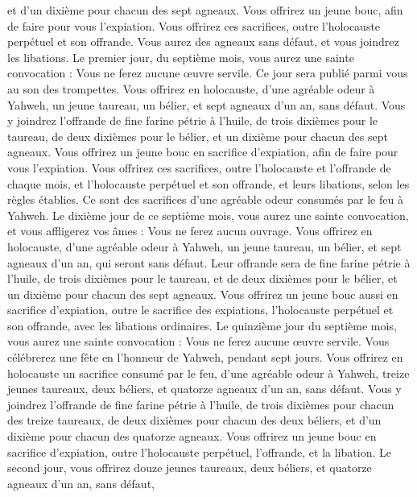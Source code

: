 \begin{multicols}{2}
et d'un dixième pour chacun des sept agneaux.
Vous offrirez un jeune bouc, afin de faire pour vous l’expiation.
Vous offrirez ces sacrifices, outre l'holocauste perpétuel et son offrande. Vous aurez des agneaux sans défaut, et vous joindrez les libations.
\VerseOne{}Le premier jour, du septième mois, vous aurez une sainte convocation : Vous ne ferez aucune œuvre servile. Ce jour sera publié parmi vous au son des trompettes.
Vous offrirez en holocauste, d’une agréable odeur à Yahweh, un jeune taureau, un bélier, et sept agneaux d'un an, sans défaut.
Vous y joindrez l’offrande de fine farine pétrie à l'huile, de trois dixièmes pour le taureau, de deux dixièmes pour le bélier,
et un dixième pour chacun des sept agneaux.
Vous offrirez un jeune bouc en sacrifice d’expiation, afin de faire pour vous l’expiation.
Vous offrirez ces sacrifices, outre l'holocauste et l’offrande de chaque mois, et l'holocauste perpétuel et son offrande, et leurs libations, selon les règles établies. Ce sont des sacrifices d’une agréable odeur consumés par le feu à Yahweh.
Le dixième jour de ce septième mois, vous aurez une sainte convocation, et vous affligerez vos âmes : Vous ne ferez aucun ouvrage.
Vous offrirez en holocauste, d’une agréable odeur à Yahweh, un jeune taureau, un bélier, et sept agneaux d'un an, qui seront sans défaut.
Leur offrande sera de fine farine pétrie à l'huile, de trois dixièmes pour le taureau, et de deux dixièmes pour le bélier,
et un dixième pour chacun des sept agneaux.
Vous offrirez un jeune bouc aussi en sacrifice d’expiation, outre le sacrifice des expiations, l'holocauste perpétuel et son offrande, avec les libations ordinaires.
Le quinzième jour du septième mois, vous aurez une sainte convocation : Vous ne ferez aucune œuvre servile. Vous célébrerez une fête en l’honneur de Yahweh, pendant sept jours.
Vous offrirez en holocauste un sacrifice consumé par le feu, d’une agréable odeur à Yahweh, treize jeunes taureaux, deux béliers, et quatorze agneaux d'un an, sans défaut.
Vous y joindrez l’offrande de fine farine pétrie à l'huile, de trois dixièmes pour chacun des treize taureaux, de deux dixièmes pour chacun des deux béliers,
et d'un dixième pour chacun des quatorze agneaux.
Vous offrirez un jeune bouc en sacrifice d’expiation, outre l'holocauste perpétuel, l’offrande, et la libation.
Le second jour, vous offrirez douze jeunes taureaux, deux béliers, et quatorze agneaux d'un an, sans défaut,

\end{multicols}
